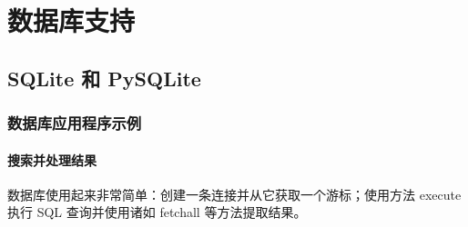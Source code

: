 \chapter{数据库支持\label{ch13}}
\section{SQLite 和 PySQLite}
\subsection{数据库应用程序示例}
\subsubsection{搜索并处理结果}
数据库使用起来非常简单：创建一条连接并从它获取一个游标；使用方法 execute 执行 SQL 查询并使用诸如 fetchall 等方法提取结果。